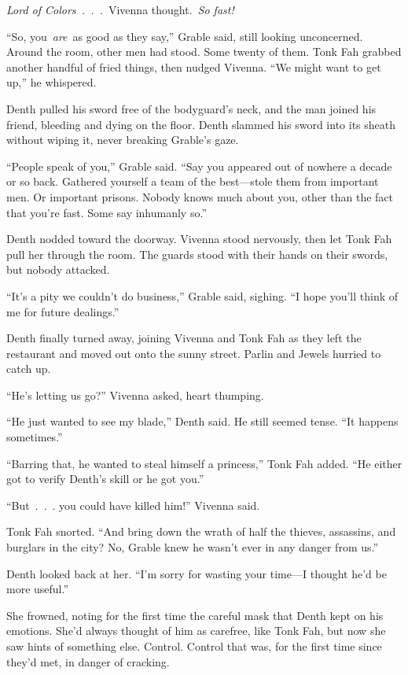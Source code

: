 \textit{Lord of Colors~.~.~.}~Vivenna thought.~\textit{So fast!}

“So, you~\textit{are}~as good as they say,” Grable said, still looking unconcerned. Around the room, other men had stood. Some twenty of them. Tonk Fah grabbed another handful of fried things, then nudged Vivenna. “We might want to get up,” he whispered.

Denth pulled his sword free of the bodyguard’s neck, and the man joined his friend, bleeding and dying on the floor. Denth slammed his sword into its sheath without wiping it, never breaking Grable’s gaze.

“People speak of you,” Grable said. “Say you appeared out of nowhere a decade or so back. Gathered yourself a team of the best—stole them from important men. Or important prisons. Nobody knows much about you, other than the fact that you’re fast. Some say inhumanly so.”

Denth nodded toward the doorway. Vivenna stood nervously, then let Tonk Fah pull her through the room. The guards stood with their hands on their swords, but nobody attacked.

“It’s a pity we couldn’t do business,” Grable said, sighing. “I hope you’ll think of me for future dealings.”

Denth finally turned away, joining Vivenna and Tonk Fah as they left the restaurant and moved out onto the sunny street. Parlin and Jewels hurried to catch up.

“He’s letting us go?” Vivenna asked, heart thumping.

“He just wanted to see my blade,” Denth said. He still seemed tense. “It happens sometimes.”

“Barring that, he wanted to steal himself a princess,” Tonk Fah added. “He either got to verify Denth’s skill or he got you.”

“But~.~.~. you could have killed him!” Vivenna said.

Tonk Fah snorted. “And bring down the wrath of half the thieves, assassins, and burglars in the city? No, Grable knew he wasn’t ever in any danger from us.”

Denth looked back at her. “I’m sorry for wasting your time—I thought he’d be more useful.”

She frowned, noting for the first time the careful mask that Denth kept on his emotions. She’d always thought of him as carefree, like Tonk Fah, but now she saw hints of something else. Control. Control that was, for the first time since they’d met, in danger of cracking.

